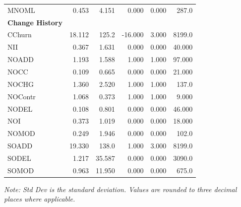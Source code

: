 \begin{longtable}{@{}lrrrrr@{}}
MNOML & 0.453 & 4.151 & 0.000 & 0.000 & 287.0 \\
\addlinespace
\textbf{Change History} & & & & & \\
CChurn & 18.112 & 125.2 & -16.000 & 3.000 & 8199.0 \\
NII & 0.367 & 1.631 & 0.000 & 0.000 & 40.000 \\
NOADD & 1.193 & 1.588 & 1.000 & 1.000 & 97.000 \\
NOCC & 0.109 & 0.665 & 0.000 & 0.000 & 21.000 \\
NOCHG & 1.360 & 2.520 & 1.000 & 1.000 & 137.0 \\
NOContr & 1.068 & 0.373 & 1.000 & 1.000 & 9.000 \\
NODEL & 0.108 & 0.801 & 0.000 & 0.000 & 46.000 \\
NOI & 0.373 & 1.019 & 0.000 & 0.000 & 18.000 \\
NOMOD & 0.249 & 1.946 & 0.000 & 0.000 & 102.0 \\
SOADD & 19.330 & 138.0 & 1.000 & 3.000 & 8199.0 \\
SODEL & 1.217 & 35.587 & 0.000 & 0.000 & 3090.0 \\
SOMOD & 0.963 & 11.950 & 0.000 & 0.000 & 675.0 \\
\end{longtable}
\normalsize

\noindent\textit{Note: Std Dev is the standard deviation. Values are rounded to three decimal places where applicable.}
